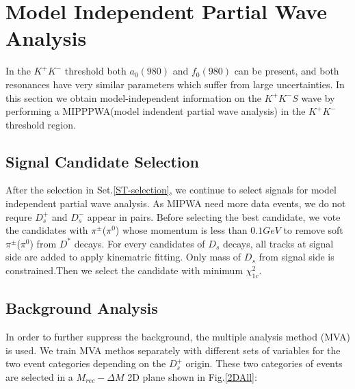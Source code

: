 \section{Model Independent Partial Wave Analysis}
\par{In the $K^{+}K^{-}$ threshold both $a_{0}(980)$ and $f_{0}(980)$ can be present, and both resonances have very similar parameters which suffer from large uncertainties. In this section we obtain model-independent information on the $K^{+}K^{-} S$ wave by performing a MIPPPWA(model indendent partial wave analysis) in the  $K^{+}K^{-}$ threshold region.}
\subsection{Signal Candidate Selection}
\label{MIPWASelection}
\par{
    After the selection in Set.\ref{ST-selection}, we continue to select signals for model independent partial wave analysis.
    As MIPWA need more data events, we do not requre $D_{s}^{+}$ and $D_{s}^{-}$ appear in pairs. 
Before selecting the best candidate,  we vote the candidates with $\pi^{\pm}$($\pi^{0}$) whose momentum is less than $0.1GeV$ to remove soft $\pi^{\pm}$($\pi^{0}$) from $D^{*}$ decays.
For every candidates of $D_{s}$ decays, all tracks at signal side are added to apply kinematric fitting. Only mass of $D_{s}$ from signal side is constrained.Then we select the candidate with minimum $\chi_{1c}^{2}$.
}
\subsection{Background Analysis}
In order to further suppress the background, the multiple analysis method (MVA) is used. We train MVA methos separately with different sets of variables for the two event categories depending on the $D_{s}^{+}$ origin. These two categories of events are selected in a $M_{rec}-\Delta{M}$ 2D plane shown in Fig.\ref{2DAll}:



